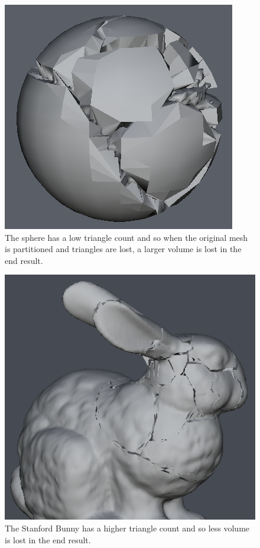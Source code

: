 \begin{figure}
\centerline{\includegraphics[scale=0.8]{voxel_sphere.png}}
\caption{The sphere has a low triangle count and so when the original mesh is partitioned and triangles are lost, a larger volume is lost in the end result.}
\label{fig:4.2}
\end{figure}
\begin{figure}
\centerline{\includegraphics[scale=0.75]{voxel_bunny.png}}
\caption{The Stanford Bunny has a higher triangle count and so less volume is lost in the end result.}
\label{fig:4.3}
\end{figure}

